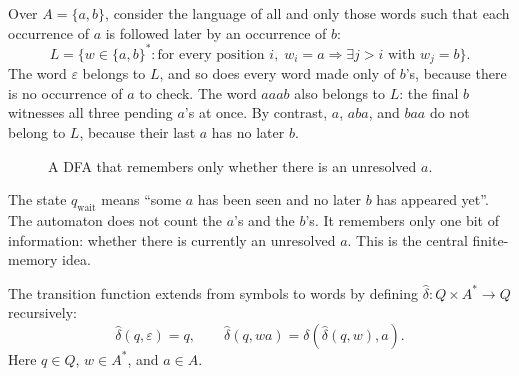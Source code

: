 \begin{example}
\label{ex:a-eventually-followed-by-b}
Over $A=\{a,b\}$, consider the language of all and only those words such
that each occurrence of $a$ is followed later by an occurrence of $b$:
\[
  L=\{w\in\{a,b\}^* :
      \text{for every position }i,\;
      w_i=a \Rightarrow \exists j>i \text{ with } w_j=b\}.
\]
The word $\varepsilon$ belongs to $L$, and so does every word made only
of $b$'s, because there is no occurrence of $a$ to check.  The word
$aaab$ also belongs to $L$: the final $b$ witnesses all three pending
$a$'s at once.  By contrast, $a$, $aba$, and $baa$ do not belong to
$L$, because their last $a$ has no later $b$.
\end{example}

\begin{figure}[ht]
\centering
{}
\caption{A DFA that remembers only whether there is an unresolved $a$.}
\label{fig:a-eventually-followed-by-b}
\end{figure}

The state $q_{\mathrm{wait}}$ means ``some $a$ has been seen and no
later $b$ has appeared yet''.  The automaton does not count the $a$'s
and the $b$'s.  It remembers only one bit of information: whether there
is currently an unresolved $a$.  This is the central finite-memory idea.


\begin{definition}
\label{def:extended-delta}
The transition function extends from symbols to words by defining
$\widehat{\delta}:Q\times A^*\to Q$ recursively:
\[
  \widehat{\delta}(q,\varepsilon)=q,
  \qquad
  \widehat{\delta}(q,wa)=\delta(\widehat{\delta}(q,w),a).
\]
Here $q\in Q$, $w\in A^*$, and $a\in A$.
\end{definition}

